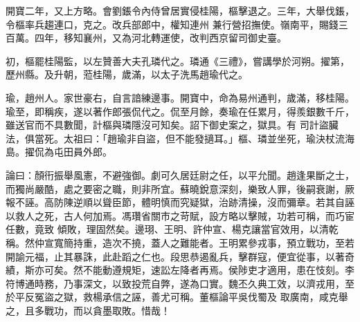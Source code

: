\begin{pinyinscope}
 開寶二年，又上方略。會劉鋹令內侍曾居實侵桂陽，樞擊退之。三年，大舉伐鋹，令樞率兵趨連口，克之。改兵部郎中，權知連州
 兼行營招撫使。嶺南平，賜錢三百萬。四年，移知襄州，又為河北轉運使，改判西京留司御史臺。



 初，樞罷桂陽監，以左贊善大夫孔璘代之。璘通《三禮》，嘗講學於河朔。擢第，歷州縣。及升朝，蒞桂陽，歲滿，以太子洗馬趙瑜代之。



 瑜，趙州人。家世豪右，自言諳練邊事。開寶中，命為易州通判，歲滿，移桂陽。瑜至，即稱疾，遂以著作郎張侃代之。侃至月餘，奏瑜在任累月，得羨銀數千斤，雖送官而不具數聞，計樞與璘隱沒可知矣。詔下御史案之，獄具。有
 司計盜臟法，俱當死。太祖曰：「趙瑜非自盜，但不能發擿耳。」樞、璘並坐死，瑜決杖流海島。擢侃為屯田員外郎。



 論曰：顏衎振舉風憲，不避強御。劇可久居廷尉之任，以平允聞。趙逢果斷之士，而獨尚嚴酷，處之要密之職，則非所宜。蘇曉銳意深刻，樂致人罪，後嗣衰謝，厥報不誣。高防陳逆順以聳臣節，體明慎而究疑獄，治跡清操，沒而彌章。若其自誣以救人之死，古人何加焉。馮瓚省關市之苛賦，設方略以擊賊，功若可稱，而巧宦任數，竟致
 傾敗，理固然矣。邊珝、王明、許仲宣、楊克讓當官效用，以清乾稱。然仲宣寬簡持重，造次不撓，蓋人之難能者。王明累參戎事，預立戰功，至若開諭元福，止其暴誅，此赴蹈之仁也。段思恭遏亂兵，擊群寇，便宜從事，以著奇績，斯亦可矣。然不能動遵規矩，速訟左降者再焉。侯陟吏才適用，患在忮刻。李符博通時務，乃事深文，以致投荒自弊，遂為口實。魏丕久典工效，以濟戎用，至於平反冤盜之獄，救楊承信之誣，善尤可稱。董樞論平吳伐蜀及
 取廣南，咸克舉之，且多戰功，而以貪墨取敗。惜哉！



\end{pinyinscope}